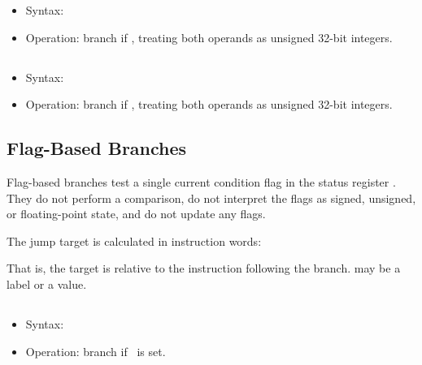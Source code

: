 \begin{itemize}
  \item Syntax: 
  \item Operation: branch if , treating both operands as
        unsigned 32-bit integers.
\end{itemize}

\subsection{}

\begin{itemize}
  \item Syntax: 
  \item Operation: branch if , treating both operands as
        unsigned 32-bit integers.
\end{itemize}

\subsection{Flag-Based Branches}

Flag-based branches test a single current condition flag in the status register
. They do not perform a comparison, do not interpret the flags as
signed, unsigned, or floating-point state, and do not update any flags.

The jump target is calculated in instruction words:


\noindent
That is, the target is relative to the instruction following the branch.
 may be a label or a value.

\subsection{}

\begin{itemize}
\item Syntax: 
\item Operation: branch if \flagN\ is set.
\end{itemize}

\subsection{}

